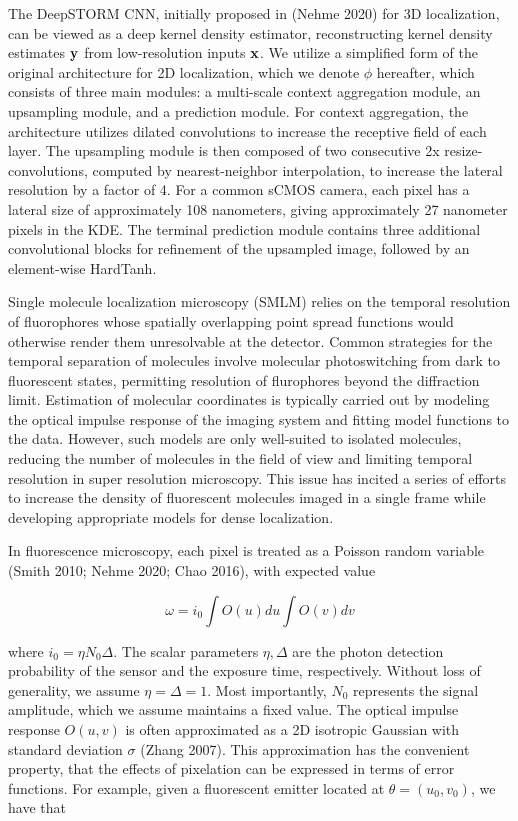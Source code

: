 \documentclass{article}
\begin{document}
The DeepSTORM CNN, initially proposed in (Nehme 2020) for 3D localization, can be viewed as a deep kernel density estimator, reconstructing kernel density estimates $\bold{y}$ from low-resolution inputs $\bold{x}$. We utilize a simplified form of the original architecture for 2D localization, which we denote $\phi$ hereafter, which consists of three main modules: a multi-scale context aggregation module, an upsampling module, and a prediction module. For context aggregation, the architecture utilizes dilated convolutions to increase the receptive field of each layer. The upsampling module is then composed of two consecutive 2x resize-convolutions, computed by nearest-neighbor interpolation, to increase the lateral resolution by a factor of 4. For a common sCMOS camera, each pixel has a lateral size of approximately 108 nanometers, giving approximately 27 nanometer pixels in the KDE. The terminal prediction module contains three additional convolutional blocks for refinement of the upsampled image, followed by an element-wise HardTanh. 


Single molecule localization microscopy (SMLM) relies on the temporal resolution of fluorophores whose spatially overlapping point spread functions would otherwise render them unresolvable at the detector. Common strategies for the temporal separation of molecules involve molecular photoswitching from dark to fluorescent states, permitting resolution of flurophores beyond the diffraction limit. Estimation of molecular coordinates is typically carried out by modeling the optical impulse response of the imaging system and fitting model functions to the data. However, such models are only well-suited to isolated molecules, reducing the number of molecules in the field of view and limiting temporal resolution in super resolution microscopy. This issue has incited a series of efforts to increase the density of fluorescent molecules imaged in a single frame while developing appropriate models for dense localization.

In fluorescence microscopy, each pixel is treated as a Poisson random variable (Smith 2010; Nehme 2020; Chao 2016), with expected value

\begin{equation}
\omega = i_{0}\int O(u)du\int O(v)dv
\end{equation}

where $i_{0} = \eta N_{0}\Delta$. The scalar parameters $\eta,\Delta$ are the photon detection probability of the sensor and the exposure time, respectively. Without loss of generality, we assume $\eta = \Delta = 1$. Most importantly, $N_{0}$ represents the signal amplitude, which we assume maintains a fixed value. The optical impulse response $O(u,v)$ is often approximated as a 2D isotropic Gaussian with standard deviation $\sigma$ (Zhang 2007). This approximation has the convenient property, that the effects of pixelation can be expressed in terms of error functions. For example, given a fluorescent emitter located at $\theta = (u_{0},v_{0})$, we have that
\end{document}
